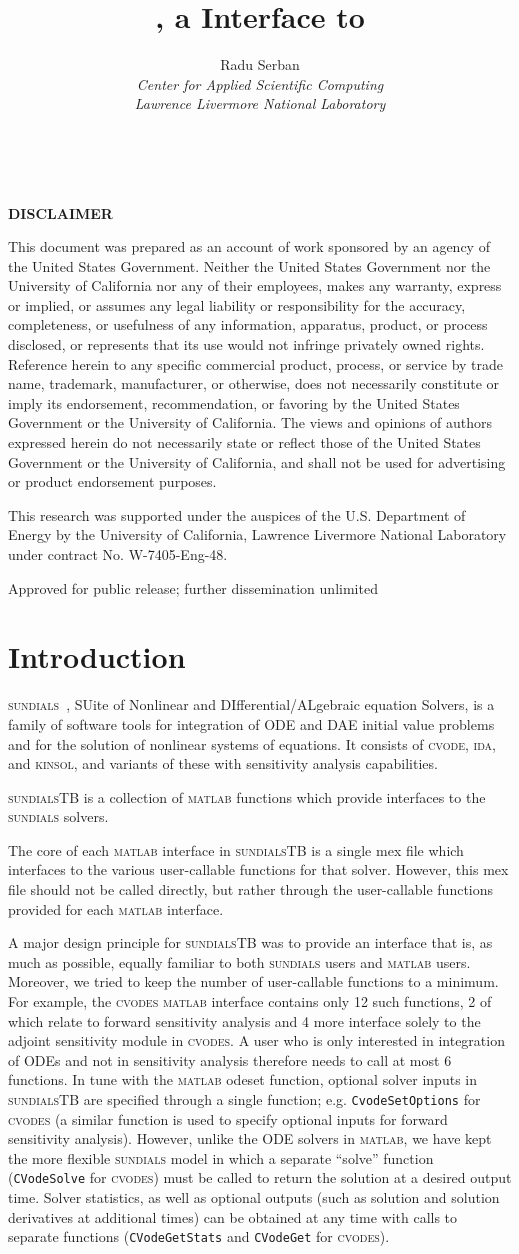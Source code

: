\documentclass[titlepage,10pt]{article}
\title{{\sundialsTB}, a {\matlab} Interface to {\sundials}}
\author{
  Radu Serban \\ 
  {\em Center for Applied Scientific Computing} \\ 
  {\em Lawrence Livermore National Laboratory}
}
\date{\STBdate \\ \vfill \STBucrl}
\newcommand{\disclaimer}{%
\changetext{.625in}{}{}{}{}
\thispagestyle{empty}%
\vglue5\baselineskip
\begin{center}
{\bf DISCLAIMER}
\end{center}
\noindent
This document was prepared as an account of work sponsored by an agency of the
United States Government.  Neither the United States Government nor the University
of California nor any of their employees, makes any warranty, express or implied,
or assumes any legal liability or responsibility for the accuracy, completeness,
or usefulness of any information, apparatus, product, or process disclosed, or
represents that its use would not infringe privately owned rights. Reference
herein to any specific commercial product, process, or service by trade name,
trademark, manufacturer, or otherwise, does not necessarily constitute or imply
its endorsement, recommendation, or favoring by the United States Government
or the University of California.  The views and opinions of authors expressed
herein do not necessarily state or reflect those of the United States Government
or the University of California, and shall not be used for advertising or
product endorsement purposes.

\vskip2\baselineskip
This research was supported under the auspices of the U.S. Department of Energy by
the University of California, Lawrence Livermore National Laboratory under
contract No.  W-7405-Eng-48.
\vfill
\begin{center}
Approved for public release; further dissemination unlimited
\end{center}
\clearpage
\changetext{-.625in}{}{}{}{}
}
\newcommand{\clearemptydoublepage}{\newpage{\pagestyle{empty}\cleardoublepage}}
\newcommand{\sundialsTB}{{\normalfont\scshape sundialsTB}}
\newcommand{\sundials}{{\normalfont\scshape sundials}}
\newcommand{\cvode}{{\normalfont\scshape cvode}}
\newcommand{\cvodes}{{\normalfont\scshape cvodes}}
\newcommand{\ida}{{\normalfont\scshape ida}}
\newcommand{\kinsol}{{\normalfont\scshape kinsol}}
\newcommand{\matlab}{{\normalfont\scshape matlab}}
\begin{document}
\pagestyle{empty}
\maketitle
\disclaimer

\tableofcontents

\clearemptydoublepage

\pagestyle{plain}

\section{Introduction}

{\sundials}~\cite{HBGLSSW:04}, SUite of Nonlinear and DIfferential/ALgebraic equation Solvers,
is a family of software tools for integration of ODE and DAE initial value problems
and for the solution of nonlinear systems of equations.
It consists of {\cvode}, {\ida}, and {\kinsol}, and variants of these with 
sensitivity analysis capabilities.

{\sundialsTB} is a collection of {\matlab} functions which provide interfaces to
the {\sundials} solvers.

The core of each {\matlab} interface in {\sundialsTB} is a single {\sc mex} 
file which interfaces to the various user-callable functions for that solver.
However, this {\sc mex} file should not be called directly, but rather through the 
user-callable functions provided for each {\matlab} interface.

A major design principle for {\sundialsTB}
was to provide an interface that is, as much as possible, equally familiar to
both {\sundials} users and {\matlab} users. Moreover, we tried to keep the
number of user-callable functions to a minimum. For example, the {\cvodes} {\matlab} 
interface contains only 12 such functions, 2 of which relate to forward sensitivity analysis and
4 more interface solely to the adjoint sensitivity module in {\cvodes}. 
A user who is only interested in integration of ODEs and not in sensitivity analysis
therefore needs to call at most 6 functions.
In tune with the {\matlab} {\sc odeset} function, optional
solver inputs in {\sundialsTB} are specified through a single function; e.g.
{\tt CvodeSetOptions} for {\cvodes} (a similar function is used to specify optional
inputs for forward sensitivity analysis). However, unlike the ODE solvers in {\matlab}, we
have kept the more flexible {\sundials} model in which a separate ``solve'' function 
({\tt CVodeSolve} for {\cvodes}) must be called to return the solution at a desired 
output time. Solver statistics, as well as optional outputs (such as
solution and solution derivatives at additional times) can be obtained at any time
with calls to separate functions ({\tt CVodeGetStats} and {\tt CVodeGet} for {\cvodes}).
\end{document}
